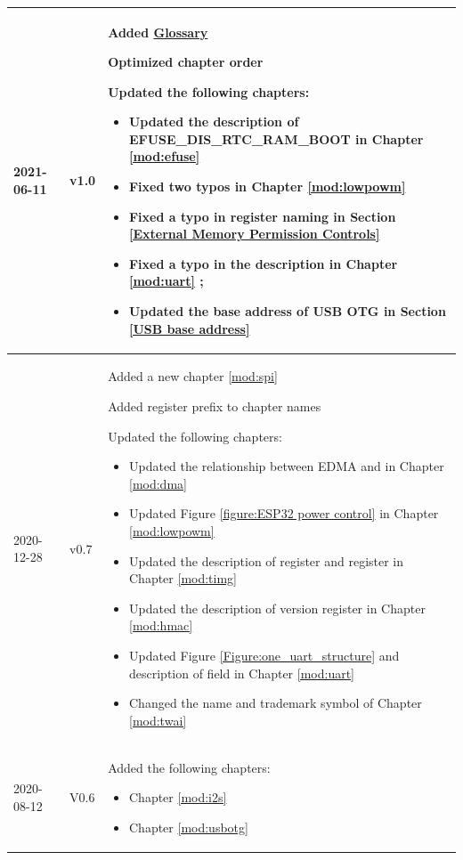 \begin{longtable}[l]{ | m{2cm} | m{1.5cm} | m{12cm} | }
    2021-06-11 & v1.0 &
    Added \hyperlink{glossary}{Glossary}

    Optimized chapter order

    Updated the following chapters:
    \begin{itemize}
        \item Updated the description of EFUSE\_DIS\_RTC\_RAM\_BOOT in Chapter \ref{mod:efuse} \textit{\nameref{mod:efuse}}
        \item Fixed two typos in Chapter \ref{mod:lowpowm} \textit{\nameref{mod:lowpowm}}
        \item Fixed a typo in register naming in Section \ref{External Memory Permission Controls} \textit{\nameref{External Memory Permission Controls}}
        \item Fixed a typo in the description \textit{\nameref{fielddesc:LEDCTICKSELTIMERX}} in Chapter \ref{mod:uart} \textit{\nameref{mod:uart}};
        \item Updated the base address of USB OTG in Section \ref{USB base address} \textit{\nameref{USB base address}}
    \vspace{-1em}
    \end{itemize}

    \\\hline
    2020-12-28 & v0.7 &
    Added a new chapter \ref{mod:spi} \textit{\nameref{mod:spi}}

    Added register prefix to chapter names

    Updated the following chapters:
    \begin{itemize}
        \item Updated the relationship between EDMA and \nameref{subsection:dma-crypto} in Chapter \ref{mod:dma} \textit{\nameref{mod:dma}}
        \item Updated Figure \ref{figure:ESP32 power control} in Chapter \ref{mod:lowpowm} \textit{\nameref{mod:lowpowm}}
        \item Updated the description of register \nameref{regdesc:TIMGRTCCALICFGREG} and register \nameref{regdesc:TIMGRTCCALICFG1REG} in Chapter \ref{mod:timg} \textit{\nameref{mod:timg}}
        \item Updated the description of version register in Chapter \ref{mod:hmac} \textit{\nameref{mod:hmac}}
        \item Updated Figure \ref{Figure:one_uart_structure} and description of \nameref{fielddesc:UARTRXDEDGECNT} field in Chapter \ref{mod:uart}
        \textit{\nameref{mod:uart}}
        \item Changed the name and trademark symbol of Chapter \ref{mod:twai} \textit{\nameref{mod:twai}}
    \vspace{-1em}
    \end{itemize}
    \\\hline
    2020-08-12 & V0.6 &
    Added the following chapters:
    \begin{itemize}
        \item Chapter \ref{mod:i2s} \textit{\nameref{mod:i2s}}
        \item Chapter \ref{mod:usbotg} \textit{\nameref{mod:usbotg}}
    \end{itemize}


\end{longtable}
